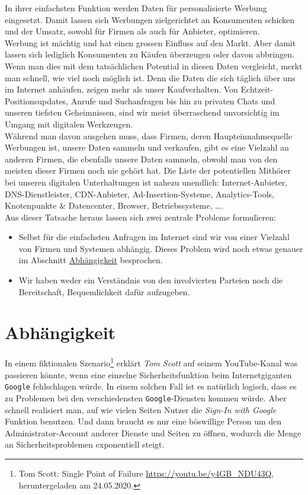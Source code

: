 \documentclass[11pt]{report}
\begin{document}
\noindent In ihrer einfachsten Funktion werden Daten für
personalisierte Werbung eingesetzt. Damit lassen sich Werbungen
zielgerichtet an Konsumenten schicken und der Umsatz, sowohl für
Firmen als auch für Anbieter, optimieren.\\

\noindent Werbung ist mächtig und hat einen grossen Einfluss auf den
Markt. Aber damit lassen sich lediglich Konsumenten zu Käufen
überzeugen oder davon abbringen. Wenn man dies mit dem tatsächlichen
Potential in diesen Daten vergleicht, merkt man schnell, wie viel noch
möglich ist. Denn die Daten die sich täglich über uns im Internet
anhäufen, zeigen mehr als unser Kaufverhalten. Von
Echtzeit-Positionsupdates, Anrufe und Suchanfragen bis hin zu privaten
Chats und unseren tiefsten Geheimnissen, sind wir meist überraschend
unvorsichtig im Umgang mit digitalen Werkzeugen.\\

\noindent Während man davon ausgehen muss, dass Firmen, deren
Haupteinnahmequelle Werbungen ist, unsere Daten sammeln und verkaufen,
gibt es eine Vielzahl an anderen Firmen, die ebenfalls unsere Daten
sammeln, obwohl man von den meisten dieser Firmen noch nie gehört hat.
Die Liste der potentiellen Mithörer bei unseren digitalen
Unterhaltungen ist nahezu unendlich: Internet-Anbieter,
DNS-Dienstleister, CDN-Anbieter, Ad-Insertion-Systeme,
Analytics-Tools, Knotenpunkte \& Datencenter, Browser, Betriebssysteme,
\ldots{}.\\

\noindent Aus dieser Tatsache heraus lassen sich zwei zentrale
Probleme formulieren:
\begin{itemize}
\item Selbst für die einfachsten Anfragen im Internet sind wir von einer
Vielzahl von Firmen und Systemen abhängig. Dieses Problem wird noch
etwas genauer im Abschnitt \hyperref[sec:org9412584]{Abhängigkeit} besprochen.
\item Wir haben weder ein Verständnis von den involvierten Parteien noch
die Bereitschaft, Bequemlichkeit dafür aufzugeben.
\end{itemize}
\section{Abhängigkeit}
\label{sec:org9412584}
In einem fiktionalen Szenario\footnote{Tom Scott: Single Point of Failure
\url{https://youtu.be/y4GB\_NDU43Q}, heruntergeladen am 24.05.2020.} erklärt \emph{Tom Scott} auf seinem
YouTube-Kanal was passieren könnte, wenn eine einzelne
Sicherheitsfunktion beim Internetgiganten \texttt{Google} fehlschlagen würde.
In einem solchen Fall ist es natürlich logisch, dass es zu Problemen
bei den verschiedensten \texttt{Google}-Diensten kommen würde. Aber schnell
realisiert man, auf wie vielen Seiten Nutzer die \emph{Sign-In with Google}
Funktion benutzen. Und dann braucht es nur eine böswillige Person um
den Administrator-Account anderer Dienste und Seiten zu öffnen,
wodurch die Menge an Sicherheitsproblemen exponentiell steigt.\\
\end{document}
